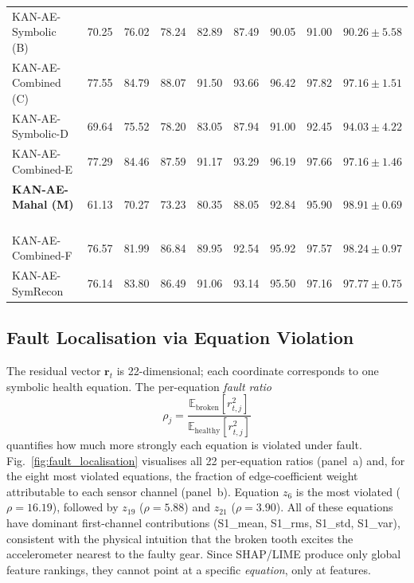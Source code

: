 \documentclass[conference]{IEEEtran}
\begin{document}
\begin{table}[t]
\begin{tabular}{lcccccccc}
KAN-AE-Symbolic (B)         & 70.25 & 76.02 & 78.24 & 82.89 & 87.49 & 90.05 & 91.00 & $90.26\pm5.58$ \\
KAN-AE-Combined (C)         & 77.55 & 84.79 & 88.07 & 91.50 & 93.66 & 96.42 & 97.82 & $97.16\pm1.51$ \\
KAN-AE-Symbolic-D           & 69.64 & 75.52 & 78.20 & 83.05 & 87.94 & 91.00 & 92.45 & $94.03\pm4.22$ \\
KAN-AE-Combined-E           & 77.29 & 84.46 & 87.59 & 91.17 & 93.29 & 96.19 & 97.66 & $97.16\pm1.46$ \\
\textbf{KAN-AE-Mahal (M)} ~\cite{Mahalanobis1ref,Mahalanobis2ref,Mahalanobis3ref}  & 61.13 & 70.27 & 73.23 & 80.35 & 88.05 & 92.84 & 95.90 & $\mathbf{98.91\pm0.69}$ \\
KAN-AE-Combined-F           & 76.57 & 81.99 & 86.84 & 89.95 & 92.54 & 95.92 & 97.57 & $98.24\pm0.97$ \\
KAN-AE-SymRecon             & 76.14 & 83.80 & 86.49 & 91.06 & 93.14 & 95.50 & 97.16 & $97.77\pm0.75$ \\
\bottomrule
\end{tabular}
\end{table}

\subsection{Fault Localisation via Equation Violation}
The residual vector $\mathbf{r}_t$ is 22-dimensional; each
coordinate corresponds to one symbolic health equation. The
per-equation \emph{fault ratio}
\begin{equation}
\rho_j =
\frac{\mathbb{E}_{\text{broken}}[r_{t,j}^2]}
     {\mathbb{E}_{\text{healthy}}[r_{t,j}^2]}
\end{equation}
quantifies how much more strongly each equation is violated
under fault. Fig.~\ref{fig:fault_localisation} visualises
all 22 per-equation ratios (panel~a) and, for the eight most
violated equations, the fraction of edge-coefficient weight
attributable to each sensor channel (panel~b).
Equation $z_6$ is the most violated
($\rho=16.19$), followed by $z_{19}$ ($\rho=5.88$) and
$z_{21}$ ($\rho=3.90$). All of these equations have
dominant first-channel contributions (S1\_mean, S1\_rms,
S1\_std, S1\_var), consistent with the physical intuition
that the broken tooth excites the accelerometer nearest to
the faulty gear. Since SHAP/LIME produce only global feature
rankings, they cannot point at a specific
\emph{equation}, only at features.
\end{document}
